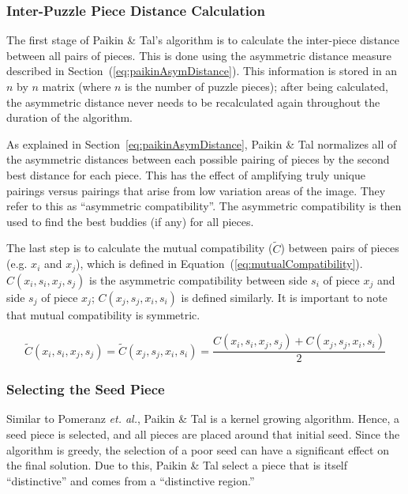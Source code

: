 \documentclass{report}
\def\eref#1{(\ref{#1})}
\begin{document}
\subsubsection{Inter-Puzzle Piece Distance Calculation}\label{sec:paikinTalInterPieceDistance}

The first stage of Paikin \& Tal's algorithm is to calculate the inter-piece distance between all pairs of pieces.  This is done using the asymmetric distance measure described in Section~\eref{eq:paikinAsymDistance}.  This information is stored in an $n$ by $n$ matrix (where $n$ is the number of puzzle pieces); after being calculated, the asymmetric distance never needs to be recalculated again throughout the duration of the algorithm.

As explained in Section~\ref{eq:paikinAsymDistance}, Paikin \& Tal normalizes all of the asymmetric distances between each possible pairing of pieces by the second best distance for each piece.  This has the effect of amplifying truly unique pairings versus pairings that arise from low variation areas of the image.  They refer to this as ``asymmetric compatibility''.  The asymmetric compatibility is then used to find the best buddies (if any) for all pieces.  

The last step is to calculate the mutual compatibility ($\tilde{C}$) between pairs of pieces (e.g. $x_i$ and $x_j$), which is defined in Equation~\eref{eq:mutualCompatibility}.  $C(x_i,s_i,x_j,s_j)$ is the asymmetric compatibility between side $s_i$ of piece $x_j$ and side $s_j$ of piece $x_j$; $C(x_j,s_j,x_i,s_i)$ is defined similarly.  It is important to note that mutual compatibility is symmetric.

\begin{equation} \label{eq:mutualCompatibility}
\tilde{C}(x_i,s_i,x_j,s_j)=\tilde{C}(x_j,s_j,x_i,s_i)=\frac{C(x_i,s_i,x_j,s_j) + C(x_j,s_j,x_i,s_i) }{2}
\end{equation}

\subsubsection{Selecting the Seed Piece}\label{sec:paikinTalSeedPiece}

Similar to Pomeranz \textit{et. al.}, Paikin \& Tal is a kernel growing algorithm.  Hence, a seed piece is selected, and all pieces are placed around that initial seed.    Since the algorithm is greedy, the selection of a poor seed can have a significant effect on the final solution.  Due to this, Paikin \& Tal select a piece that is itself ``distinctive'' and comes from a ``distinctive region.''  
\end{document}
